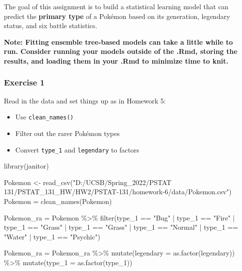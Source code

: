 \documentclass[
]{article}
\newenvironment{Shaded}{\begin{snugshade}}{\end{snugshade}}
\newcommand{\AttributeTok}[1]{\textcolor[rgb]{0.77,0.63,0.00}{#1}}
\newcommand{\FunctionTok}[1]{\textcolor[rgb]{0.00,0.00,0.00}{#1}}
\newcommand{\NormalTok}[1]{#1}
\newcommand{\OtherTok}[1]{\textcolor[rgb]{0.56,0.35,0.01}{#1}}
\newcommand{\SpecialCharTok}[1]{\textcolor[rgb]{0.00,0.00,0.00}{#1}}
\newcommand{\StringTok}[1]{\textcolor[rgb]{0.31,0.60,0.02}{#1}}
\providecommand{\tightlist}{%
  \setlength{\itemsep}{0pt}\setlength{\parskip}{0pt}}
\begin{document}
The goal of this assignment is to build a statistical learning model
that can predict the \textbf{primary type} of a Pokémon based on its
generation, legendary status, and six battle statistics.

\textbf{Note: Fitting ensemble tree-based models can take a little while
to run. Consider running your models outside of the .Rmd, storing the
results, and loading them in your .Rmd to minimize time to knit.}

\hypertarget{exercise-1}{%
\subsubsection{Exercise 1}\label{exercise-1}}

Read in the data and set things up as in Homework 5:

\begin{itemize}
\tightlist
\item
  Use \texttt{clean\_names()}
\item
  Filter out the rarer Pokémon types
\item
  Convert \texttt{type\_1} and \texttt{legendary} to factors
\end{itemize}

\begin{Shaded}
\begin{Highlighting}[]
\FunctionTok{library}\NormalTok{(janitor)}

\NormalTok{Pokemon }\OtherTok{\textless{}{-}} \FunctionTok{read\_csv}\NormalTok{(}\StringTok{"D:/UCSB/Spring\_2022/PSTAT 131/PSTAT\_131\_HW/HW2/PSTAT{-}131/homework{-}6/data/Pokemon.csv"}\NormalTok{)}
\NormalTok{Pokemon }\OtherTok{=} \FunctionTok{clean\_names}\NormalTok{(Pokemon)}
\end{Highlighting}
\end{Shaded}

\begin{Shaded}
\begin{Highlighting}[]
\NormalTok{Pokemon\_ra }\OtherTok{=}\NormalTok{ Pokemon }\SpecialCharTok{\%\textgreater{}\%} \FunctionTok{filter}\NormalTok{(type\_1 }\SpecialCharTok{==} \StringTok{"Bug"} \SpecialCharTok{|}\NormalTok{ type\_1 }\SpecialCharTok{==} \StringTok{"Fire"} \SpecialCharTok{|} 
\NormalTok{                                type\_1 }\SpecialCharTok{==} \StringTok{"Grass"} \SpecialCharTok{|}\NormalTok{ type\_1 }\SpecialCharTok{==} \StringTok{"Grass"} \SpecialCharTok{|}
\NormalTok{                                type\_1 }\SpecialCharTok{==} \StringTok{"Normal"} \SpecialCharTok{|}\NormalTok{ type\_1 }\SpecialCharTok{==} \StringTok{"Water"} \SpecialCharTok{|}
\NormalTok{                                type\_1 }\SpecialCharTok{==} \StringTok{"Psychic"}\NormalTok{)  }

\NormalTok{Pokemon\_ra }\OtherTok{=}\NormalTok{ Pokemon\_ra }\SpecialCharTok{\%\textgreater{}\%} 
  \FunctionTok{mutate}\NormalTok{(}\AttributeTok{legendary =} \FunctionTok{as.factor}\NormalTok{(legendary)) }\SpecialCharTok{\%\textgreater{}\%}
  \FunctionTok{mutate}\NormalTok{(}\AttributeTok{type\_1 =} \FunctionTok{as.factor}\NormalTok{(type\_1))}
\end{Highlighting}
\end{Shaded}
\end{document}
